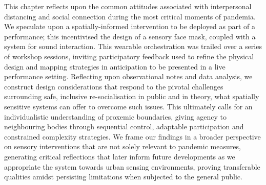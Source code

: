 This chapter reflects upon the common attitudes associated with interpersonal distancing and social connection during the most critical moments of pandemia. We speculate upon a spatially-informed intervention to be deployed as part of a performance; this incentivised the design of a sensory face mask, coupled with a system for sound interaction. This wearable orchestration was trailed over a series of workshop sessions, inviting participatory feedback used to refine the physical design and mapping strategies in anticipation to be presented in a live performance setting. Reflecting upon observational notes and data analysis, we construct design considerations that respond to the pivotal challenges surrounding safe, inclusive re-socialisation in public and in theory, what spatially sensitive systems can offer to overcome such issues. This ultimately calls for an individualistic understanding of proxemic boundaries, giving agency to neighbouring bodies through sequential control, adaptable participation and constrained complexity strategies. We frame our findings in a broader perspective on sensory interventions that are not solely relevant to pandemic measures, generating critical reflections that later inform future developments as we appropriate the system towards urban sensing environments, proving transferable qualities amidst persisting limitations when subjected to the general public.



